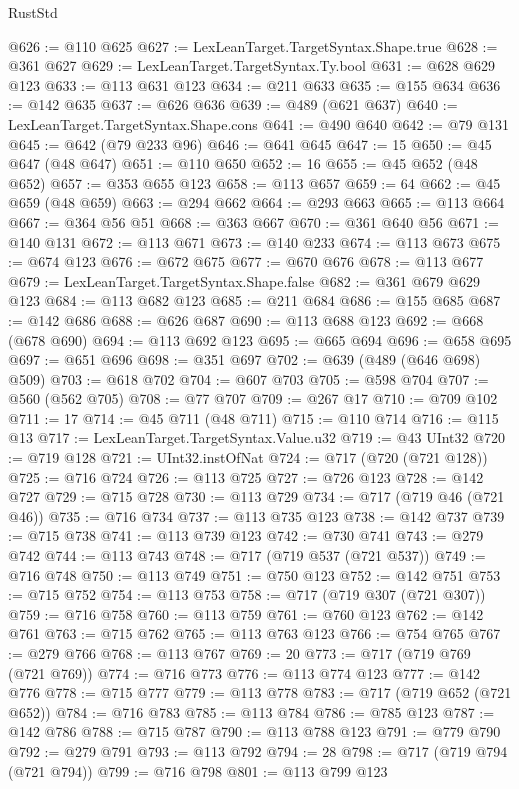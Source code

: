 \begin{lexlean}{RustStd}
\begin{coremodule}
@626 := @110 @625
@627 := LexLeanTarget.TargetSyntax.Shape.true
@628 := @361 @627
@629 := LexLeanTarget.TargetSyntax.Ty.bool
@631 := @628 @629 @123
@633 := @113 @631 @123
@634 := @211 @633
@635 := @155 @634
@636 := @142 @635
@637 := @626 @636
@639 := @489 (@621 @637)
@640 := LexLeanTarget.TargetSyntax.Shape.cons
@641 := @490 @640
@642 := @79 @131
@645 := @642 (@79 @233 @96)
@646 := @641 @645
@647 := 15
@650 := @45 @647 (@48 @647)
@651 := @110 @650
@652 := 16
@655 := @45 @652 (@48 @652)
@657 := @353 @655 @123
@658 := @113 @657
@659 := 64
@662 := @45 @659 (@48 @659)
@663 := @294 @662
@664 := @293 @663
@665 := @113 @664
@667 := @364 @56 @51
@668 := @363 @667
@670 := @361 @640 @56
@671 := @140 @131
@672 := @113 @671
@673 := @140 @233
@674 := @113 @673
@675 := @674 @123
@676 := @672 @675
@677 := @670 @676
@678 := @113 @677
@679 := LexLeanTarget.TargetSyntax.Shape.false
@682 := @361 @679 @629 @123
@684 := @113 @682 @123
@685 := @211 @684
@686 := @155 @685
@687 := @142 @686
@688 := @626 @687
@690 := @113 @688 @123
@692 := @668 (@678 @690)
@694 := @113 @692 @123
@695 := @665 @694
@696 := @658 @695
@697 := @651 @696
@698 := @351 @697
@702 := @639 (@489 (@646 @698) @509)
@703 := @618 @702
@704 := @607 @703
@705 := @598 @704
@707 := @560 (@562 @705)
@708 := @77 @707
@709 := @267 @17
@710 := @709 @102
@711 := 17
@714 := @45 @711 (@48 @711)
@715 := @110 @714
@716 := @115 @13
@717 := LexLeanTarget.TargetSyntax.Value.u32
@719 := @43 UInt32
@720 := @719 @128
@721 := UInt32.instOfNat
@724 := @717 (@720 (@721 @128))
@725 := @716 @724
@726 := @113 @725
@727 := @726 @123
@728 := @142 @727
@729 := @715 @728
@730 := @113 @729
@734 := @717 (@719 @46 (@721 @46))
@735 := @716 @734
@737 := @113 @735 @123
@738 := @142 @737
@739 := @715 @738
@741 := @113 @739 @123
@742 := @730 @741
@743 := @279 @742
@744 := @113 @743
@748 := @717 (@719 @537 (@721 @537))
@749 := @716 @748
@750 := @113 @749
@751 := @750 @123
@752 := @142 @751
@753 := @715 @752
@754 := @113 @753
@758 := @717 (@719 @307 (@721 @307))
@759 := @716 @758
@760 := @113 @759
@761 := @760 @123
@762 := @142 @761
@763 := @715 @762
@765 := @113 @763 @123
@766 := @754 @765
@767 := @279 @766
@768 := @113 @767
@769 := 20
@773 := @717 (@719 @769 (@721 @769))
@774 := @716 @773
@776 := @113 @774 @123
@777 := @142 @776
@778 := @715 @777
@779 := @113 @778
@783 := @717 (@719 @652 (@721 @652))
@784 := @716 @783
@785 := @113 @784
@786 := @785 @123
@787 := @142 @786
@788 := @715 @787
@790 := @113 @788 @123
@791 := @779 @790
@792 := @279 @791
@793 := @113 @792
@794 := 28
@798 := @717 (@719 @794 (@721 @794))
@799 := @716 @798
@801 := @113 @799 @123

\end{coremodule}
\end{lexlean}
